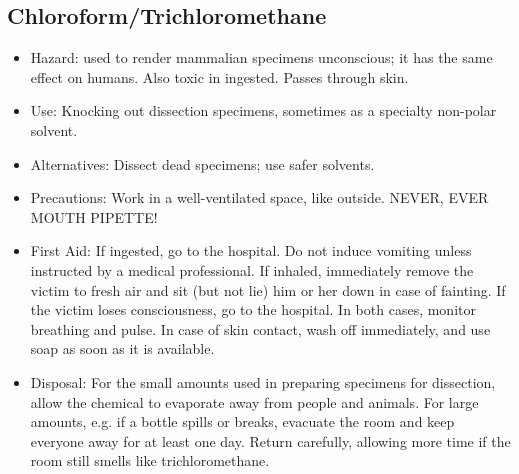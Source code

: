 \subsection{Chloroform/Trichloromethane}
\begin{itemize}
\item{Hazard: used to render mammalian specimens unconscious; 
it has the same effect on humans. 
Also toxic in ingested. Passes through skin.}
\item{Use: Knocking out dissection specimens, 
sometimes as a specialty non-polar solvent.}
\item{Alternatives: Dissect dead specimens; 
use safer solvents.}
\item{Precautions: Work in a well-ventilated space, like outside. 
NEVER, EVER MOUTH PIPETTE!}
\item{First Aid: If ingested, go to the hospital. 
Do not induce vomiting unless instructed by a medical professional. 
If inhaled, immediately remove the victim to fresh air and sit 
(but not lie) him or her down in case of fainting. 
If the victim loses consciousness, go to the hospital. 
In both cases, monitor breathing and pulse. 
In case of skin contact, wash off immediately, 
and use soap as soon as it is available.}
\item{Disposal: For the small amounts used 
in preparing specimens for dissection, 
allow the chemical to evaporate away from people and animals. 
For large amounts, e.g. if a bottle spills or breaks, 
evacuate the room and keep everyone away for at least one day. 
Return carefully, allowing more time 
if the room still smells like trichloromethane.}
\end{itemize}

